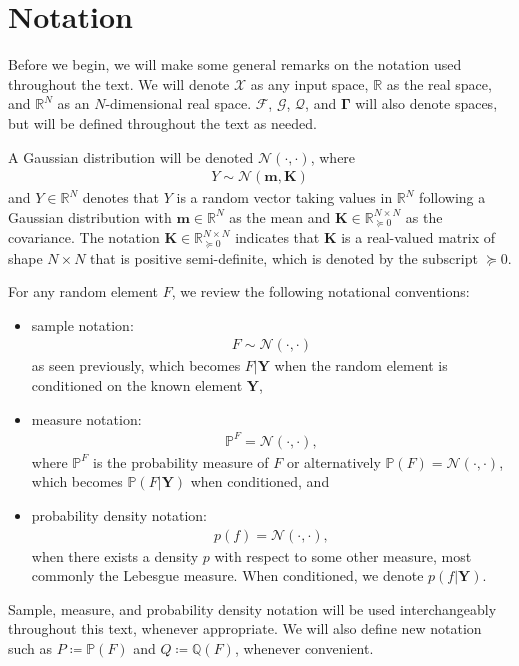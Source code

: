\documentclass{article}
\numberwithin{equation}{section}
\begin{document}
\newpage
\section{Notation}
Before we begin, we will make some general remarks on the notation used throughout the text. 
We will denote $\mathcal{X}$ as any input space, $\mathbb{R}$ as the real space, and $\mathbb{R}^N$ as an $N$-dimensional real space. 
$\boldsymbol{\boldsymbol{\mathcal{F}}}$, $\boldsymbol{\mathcal{G}}$, $\boldsymbol{\mathcal{Q}}$, and $\boldsymbol{\Gamma}$ will also denote spaces, but will be defined throughout the text as needed.

A Gaussian distribution will be denoted $\mathcal{N}(\cdot, \cdot)$, where 
\begin{align}
    Y \sim \mathcal{N}(\mathbf{m}, \mathbf{K})
\end{align}
and $Y \in \mathbb{R}^N$ denotes that $Y$ is a random vector taking values in $\mathbb{R}^N$ following a Gaussian distribution with $\mathbf{m} \in \mathbb{R}^N$ as the mean and $\mathbf{K} \in \mathbb{R}^{N \times N}_{\succcurlyeq 0}$ as the covariance. 
The notation $\mathbf{K} \in \mathbb{R}^{N \times N}_{\succcurlyeq 0}$ indicates that $\mathbf{K}$ is a real-valued matrix of shape $N \times N$ that is positive semi-definite, which is denoted by the subscript ${\succcurlyeq 0}$. 


For any random element $F$, we review the following notational conventions:
\begin{itemize}
    \setlength\itemsep{0em}
    \item sample notation: 
        \begin{align}
            F \sim \mathcal{N}(\cdot, \cdot)
        \end{align}
        as seen previously, which becomes $F \vert \mathbf{Y}$ when the random element is conditioned on the known element $\mathbf{Y}$,
    \item measure notation: 
        \begin{align}
            \mathbb{P}^F = \mathcal{N}(\cdot, \cdot),
        \end{align}
        where $\mathbb{P}^F$ is the probability measure of $F$ or alternatively $\mathbb{P}(F) = \mathcal{N}(\cdot, \cdot)$, which becomes $\mathbb{P}(F \vert \mathbf{Y})$ when conditioned, and
    \item probability density notation: 
        \begin{align}
           p(f) = \mathcal{N}(\cdot, \cdot),
        \end{align}
        when there exists a density $p$ with respect to some other measure, most commonly the Lebesgue measure. 
        When conditioned, we denote $p(f\vert \mathbf{Y})$.
\end{itemize}
Sample, measure, and probability density notation will be used interchangeably throughout this text, whenever appropriate. 
We will also define new notation such as $P \coloneqq \mathbb{P}(F)$ and $Q \coloneqq \mathbb{Q}(F)$, whenever convenient.
\end{document}
